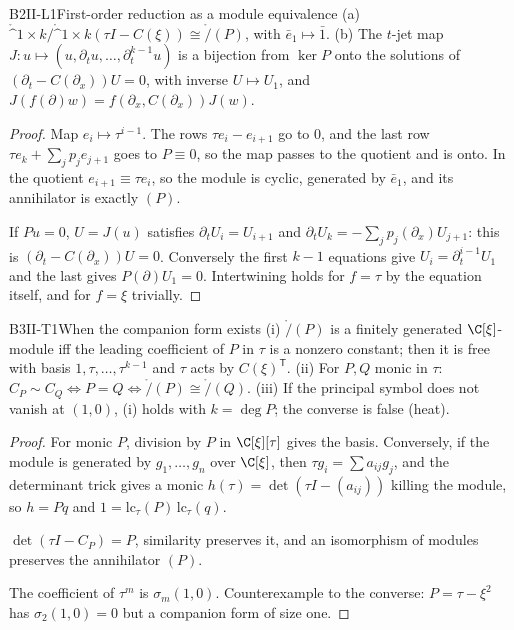 \begin{dimcard}{B2}{II-L1}{First-order reduction as a module equivalence}{\pw}{}
(a) $\ring^{1\times k}/\ring^{1\times k}(\tau I-C(\xi))\cong\ring/(P)$, with $\bar e_1\mapsto\bar1$. (b) The $t$-jet map $J:u\mapsto(u,\partial_tu,\dots,\partial_t^{k-1}u)$ is a bijection from $\ker P$ onto the solutions of $(\partial_t-C(\partial_x))U=0$, with inverse $U\mapsto U_1$, and $J(f(\partial)w)=f(\partial_x,C(\partial_x))J(w)$.
\end{dimcard}
\begin{proof}
Map $e_i\mapsto\tau^{i-1}$. The rows $\tau e_i-e_{i+1}$ go to $0$, and the last row $\tau e_k+\sum_jp_je_{j+1}$ goes to $P\equiv0$, so the map passes to the quotient and is onto. In the quotient $e_{i+1}\equiv\tau e_i$, so the module is cyclic, generated by $\bar e_1$, and its annihilator is exactly $(P)$.

If $Pu=0$, $U=J(u)$ satisfies $\partial_tU_i=U_{i+1}$ and $\partial_tU_k=-\sum_jp_j(\partial_x)U_{j+1}$: this is $(\partial_t-C(\partial_x))U=0$. Conversely the first $k-1$ equations give $U_i=\partial_t^{i-1}U_1$ and the last gives $P(\partial)U_1=0$. Intertwining holds for $f=\tau$ by the equation itself, and for $f=\xi$ trivially.
\end{proof}

\begin{dimcard}{B3}{II-T1}{When the companion form exists}{\pw}{}
(i) $\ring/(P)$ is a finitely generated $\C[\xi]$-module iff the leading coefficient of $P$ in $\tau$ is a nonzero constant; then it is free with basis $1,\tau,\dots,\tau^{k-1}$ and $\tau$ acts by $C(\xi)^{\mathsf T}$. (ii) For $P,Q$ monic in $\tau$: $C_P\sim C_Q\iff P=Q\iff\ring/(P)\cong\ring/(Q)$. (iii) If the principal symbol does not vanish at $(1,0)$, (i) holds with $k=\deg P$; the converse is false (heat).
\end{dimcard}
\begin{proof}
For monic $P$, division by $P$ in $\C[\xi][\tau]$ gives the basis. Conversely, if the module is generated by $g_1,\dots,g_n$ over $\C[\xi]$, then $\tau g_i=\sum a_{ij}g_j$, and the determinant trick gives a monic $h(\tau)=\det(\tau I-(a_{ij}))$ killing the module, so $h=Pq$ and $1=\mathrm{lc}_\tau(P)\,\mathrm{lc}_\tau(q)$.

$\det(\tau I-C_P)=P$, similarity preserves it, and an isomorphism of modules preserves the annihilator $(P)$.

The coefficient of $\tau^m$ is $\sigma_m(1,0)$. Counterexample to the converse: $P=\tau-\xi^2$ has $\sigma_2(1,0)=0$ but a companion form of size one.
\end{proof}

